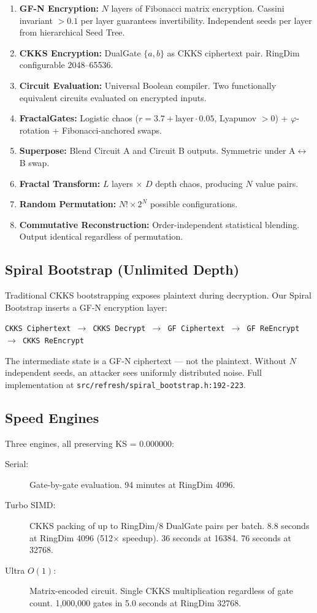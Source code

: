 \documentclass[11pt,a4paper]{article}
\begin{document}
\begin{enumerate}
\item \textbf{GF-N Encryption:} $N$ layers of Fibonacci matrix encryption. Cassini invariant $> 0.1$ per layer guarantees invertibility. Independent seeds per layer from hierarchical Seed Tree.
\item \textbf{CKKS Encryption:} DualGate $\{a, b\}$ as CKKS ciphertext pair. RingDim configurable 2048--65536.
\item \textbf{Circuit Evaluation:} Universal Boolean compiler. Two functionally equivalent circuits evaluated on encrypted inputs.
\item \textbf{FractalGates:} Logistic chaos ($r = 3.7 + \text{layer} \cdot 0.05$, Lyapunov $> 0$) + $\varphi$-rotation + Fibonacci-anchored swaps.
\item \textbf{Superpose:} Blend Circuit A and Circuit B outputs. Symmetric under A$\leftrightarrow$B swap.
\item \textbf{Fractal Transform:} $L$ layers $\times$ $D$ depth chaos, producing $N$ value pairs.
\item \textbf{Random Permutation:} $N! \times 2^N$ possible configurations.
\item \textbf{Commutative Reconstruction:} Order-independent statistical blending. Output identical regardless of permutation.
\end{enumerate}

\subsection{Spiral Bootstrap (Unlimited Depth)}

Traditional CKKS bootstrapping exposes plaintext during decryption. Our Spiral Bootstrap inserts a GF-N encryption layer:

\texttt{CKKS Ciphertext $\to$ CKKS Decrypt $\to$ GF Ciphertext $\to$ GF ReEncrypt $\to$ CKKS ReEncrypt}

The intermediate state is a GF-N ciphertext --- not the plaintext. Without $N$ independent seeds, an attacker sees uniformly distributed noise. Full implementation at \texttt{src/refresh/spiral\_bootstrap.h:192-223}.

\subsection{Speed Engines}

Three engines, all preserving KS = 0.000000:

\begin{description}
\item[Serial:] Gate-by-gate evaluation. 94 minutes at RingDim 4096.
\item[Turbo SIMD:] CKKS packing of up to RingDim/8 DualGate pairs per batch. 8.8 seconds at RingDim 4096 (512$\times$ speedup). 36 seconds at 16384. 76 seconds at 32768.
\item[Ultra $O(1)$:] Matrix-encoded circuit. Single CKKS multiplication regardless of gate count. 1,000,000 gates in 5.0 seconds at RingDim 32768.
\end{description}
\end{document}
